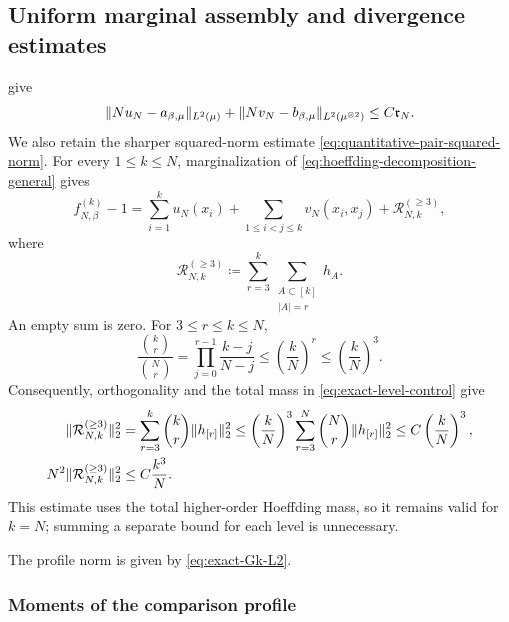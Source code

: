 \documentclass[11pt,reqno]{amsart}
\numberwithin{equation}{section}
\theoremstyle{plain}
\theoremstyle{remark}
\DeclarePairedDelimiter{\norm}{\lVert}{\rVert}
\newcommand{\be}{\beta}
\begin{document}
\subsection{Uniform marginal assembly and divergence estimates}
\label{subsubsec:exact-profile-assembly}

give
\begin{equation}\label{eq:quantitative-kernel-rates}
 \norm{Nu_N-a_{\be,\mu}}_{L^2(\mu)}
 +\norm{Nv_N-b_{\be,\mu}}_{L^2(\mu^{\otimes2})}
 \leq C\mathfrak r_N.
\end{equation}
We also retain the sharper squared-norm estimate
\eqref{eq:quantitative-pair-squared-norm}.
For every $1\leq k\leq N$, marginalization of \eqref{eq:hoeffding-decomposition-general} gives
\begin{equation}\label{eq:exact-marginal-Hoeffding}
 f_{N,\be}^{(k)}-1
 =\sum_{i=1}^ku_N(x_i)+\sum_{1\leq i<j\leq k}v_N(x_i,x_j)
 +\mathcal R_{N,k}^{(\geq3)},
\end{equation}
where
\begin{equation}\label{eq:exact-higher-remainder}
 \mathcal R_{N,k}^{(\geq3)}\coloneqq
 \sum_{r=3}^k\sum_{\substack{A\subset[k]\\|A|=r}}h_A.
\end{equation}
An empty sum is zero.  For $3\leq r\leq k\leq N$,
\begin{equation}\label{eq:quantitative-binomial-ratio}
 \frac{\binom kr}{\binom Nr}
 =\prod_{j=0}^{r-1}\frac{k-j}{N-j}
 \leq\left(\frac kN\right)^r\leq\left(\frac kN\right)^3.
\end{equation}
Consequently, orthogonality and the total mass in \eqref{eq:exact-level-control} give
\begin{align}
 \norm{\mathcal R_{N,k}^{(\geq3)}}_2^2
 &=\sum_{r=3}^k\binom kr\norm{h_{[r]}}_2^2
 \leq\left(\frac kN\right)^3\sum_{r=3}^N\binom Nr\norm{h_{[r]}}_2^2
 \leq C\left(\frac kN\right)^3,
 \label{eq:exact-higher-tail-fixed}\\
 N^2\norm{\mathcal R_{N,k}^{(\geq3)}}_2^2&\leq C\frac{k^3}{N}.
 \label{eq:exact-higher-tail-scaled}
\end{align}
This estimate uses the total higher-order Hoeffding mass, so it remains valid for $k=N$; summing a separate bound for each level is unnecessary.

The profile norm is given by \eqref{eq:exact-Gk-L2}.
\subsubsection{Moments of the comparison profile}
\label{subsubsec:profile-moments}
\end{document}
